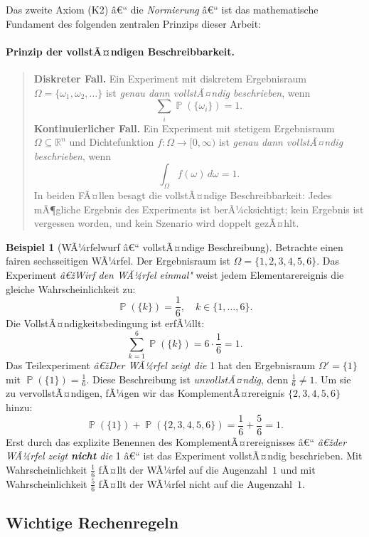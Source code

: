 ﻿\documentclass[12pt,a4paper]{article}
\theoremstyle{definition}
\newtheorem{beispiel}{Beispiel}[section]
\theoremstyle{plain}
\theoremstyle{remark}
\DeclareMathOperator{\Prob}{\mathbb{P}}
\begin{document}
Das zweite Axiom (K2) â€“ die \emph{Normierung} â€“ ist das mathematische Fundament
des folgenden zentralen Prinzips dieser Arbeit:

\paragraph*{Prinzip der vollstÃ¤ndigen Beschreibbarkeit.}
\begin{quote}
  \textbf{Diskreter Fall.} Ein Experiment mit diskretem Ergebnisraum
  $\Omega = \{\omega_1, \omega_2, \ldots\}$ ist \emph{genau dann vollstÃ¤ndig
  beschrieben}, wenn
  \[
    \sum_{i} \Prob(\{\omega_i\}) = 1.
  \]
  \textbf{Kontinuierlicher Fall.} Ein Experiment mit stetigem Ergebnisraum
  $\Omega \subseteq \mathbb{R}^n$ und Dichtefunktion $f\colon \Omega \to [0,\infty)$
  ist \emph{genau dann vollstÃ¤ndig beschrieben}, wenn
  \[
    \int_{\Omega} f(\omega)\, d\omega = 1.
  \]
  In beiden FÃ¤llen besagt die vollstÃ¤ndige Beschreibbarkeit: Jedes mÃ¶gliche
  Ergebnis des Experiments ist berÃ¼cksichtigt; kein Ergebnis ist \glqq
  vergessen\grqq{} worden, und kein Szenario wird doppelt gezÃ¤hlt.
\end{quote}

\begin{beispiel}[WÃ¼rfelwurf â€“ vollstÃ¤ndige Beschreibung]\label{bsp:wuerfel}
  Betrachte einen fairen sechsseitigen WÃ¼rfel. Der Ergebnisraum ist
  $\Omega = \{1, 2, 3, 4, 5, 6\}$. Das Experiment \emph{â€žWirf den WÃ¼rfel
  einmal"} weist jedem Elementarereignis die gleiche Wahrscheinlichkeit zu:
  \[
    \Prob(\{k\}) = \frac{1}{6}, \quad k \in \{1,\ldots,6\}.
  \]
  Die VollstÃ¤ndigkeitsbedingung ist erfÃ¼llt:
  \[
    \sum_{k=1}^{6} \Prob(\{k\}) = 6 \cdot \frac{1}{6} = 1.
  \]
  Das Teilexperiment \emph{â€žDer WÃ¼rfel zeigt die } 1 hat den Ergebnisraum
  $\Omega' = \{1\}$ mit $\Prob(\{1\}) = \frac{1}{6}$. Diese Beschreibung ist
  \emph{unvollstÃ¤ndig}, denn $\frac{1}{6} \neq 1$. Um sie zu vervollstÃ¤ndigen,
  fÃ¼gen wir das KomplementÃ¤rereignis $\{2,3,4,5,6\}$ hinzu:
  \[
    \Prob(\{1\}) + \Prob(\{2,3,4,5,6\}) = \frac{1}{6} + \frac{5}{6} = 1.
  \]
  Erst durch das explizite Benennen des KomplementÃ¤rereignisses â€“ \emph{â€žder
  WÃ¼rfel zeigt \textbf{nicht} die }1 â€“ ist das Experiment vollstÃ¤ndig
  beschrieben. Mit Wahrscheinlichkeit $\frac{1}{6}$ fÃ¤llt der WÃ¼rfel auf die
  Augenzahl~$1$ und mit Wahrscheinlichkeit $\frac{5}{6}$ fÃ¤llt der WÃ¼rfel
  nicht auf die Augenzahl~$1$.
\end{beispiel}

\subsection{Wichtige Rechenregeln}
\end{document}
